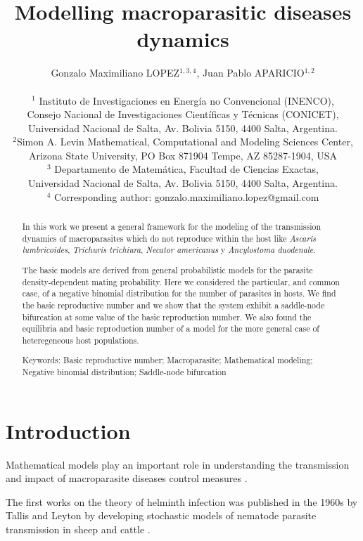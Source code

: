 \documentclass[12pt,a4paper]{article}
\title{Modelling macroparasitic diseases dynamics}
\author{Gonzalo Maximiliano LOPEZ$^{1,3,4}$, Juan Pablo APARICIO$^{1,2}$\\
	\\
	{\small $^1$ Instituto de Investigaciones en Energ\'ia no Convencional (INENCO),} \\ {\small Consejo Nacional de Investigaciones Cient\'ificas y T\'ecnicas (CONICET),}\\
	{\small Universidad Nacional de Salta, Av. Bolivia 5150, 4400 Salta, Argentina.}\\
	$^2${\small Simon A. Levin Mathematical, Computational and Modeling Sciences Center,} \\ {\small Arizona State University, PO Box 871904 Tempe, AZ 85287-1904, USA}\\
	{\small $^3$ Departamento de Matem\'atica, Facultad de Ciencias Exactas,}\\{\small Universidad Nacional de Salta, Av. Bolivia 5150, 4400 Salta, Argentina.}\\
	{\small $^4$ Corresponding author: gonzalo.maximiliano.lopez@gmail.com}}
\date{}
\theoremstyle{plain}%
\theoremstyle{definition}
\theoremstyle{remark}
\begin{document}
\maketitle
\begin{abstract}
	
	In this work we present a general framework for the modeling of the transmission dynamics of macroparasites which do not reproduce within the host like \textit{Ascaris lumbricoides}, \textit{Trichuris trichiura}, \textit{Necator americanus} y \textit{Ancylostoma duodenale}.  
	
	
	The basic models are derived from general probabilistic models for the parasite density-dependent mating probability. Here we considered the particular, and common case, of a negative binomial distribution for the number of parasites in hosts. We find the basic reproductive number  and we show that the system exhibit a saddle-node bifurcation at some value of the basic reproduction number. 
	 We also found the equilibria and basic reproduction number of a model for the more general case of heteregeneous host populations. 
	
	
	
%	
%	
%	
%	

	Keywords: Basic reproductive number; Macroparasite; Mathematical modeling; Negative binomial distribution; Saddle-node bifurcation 
\end{abstract}
\tableofcontents
\tableofcontents
\section{Introduction}
	
 	Mathematical models play an important role in understanding the transmission and impact of macroparasite diseases control measures \cite{anderson1992infectious,anderson2014coverage,truscott2016soil}.

	The first works on the theory of helminth infection was published in the 1960s by Tallis and Leyton by developing stochastic models of nematode parasite transmission in sheep and cattle \cite{leyton1968stochastic,tallis1966stochastic,tallis1969stochastic}.
 	
\end{document}
